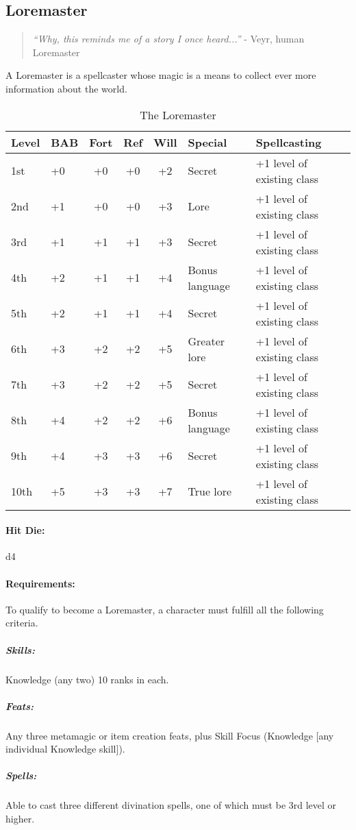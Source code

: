 \subsection{Loremaster}
\begin{quote}
\emph{``Why, this reminds me of a story I once heard...''}
- Veyr, human Loremaster
\end{quote}
A Loremaster is a spellcaster whose magic is a means to collect ever more information about the world.

\begin{table*}
\centering
\caption{The Loremaster}
\label{tab:Loremaster}
\begin{tabular}{llcccll}
\toprule
Level	&BAB	&Fort 	&Ref 	&Will 	&Special	&Spellcasting\\
\midrule
1st	&+0	&+0	&+0	&+2	&Secret		&+1 level of existing class\\
2nd	&+1	&+0	&+0	&+3	&Lore		&+1 level of existing class\\
3rd	&+1	&+1	&+1	&+3	&Secret		&+1 level of existing class\\
4th	&+2	&+1	&+1	&+4	&Bonus language	&+1 level of existing class\\
5th	&+2	&+1	&+1	&+4	&Secret		&+1 level of existing class\\
6th	&+3	&+2	&+2	&+5	&Greater lore	&+1 level of existing class\\
7th	&+3	&+2	&+2	&+5	&Secret		&+1 level of existing class\\
8th	&+4	&+2	&+2	&+6	&Bonus language	&+1 level of existing class\\
9th	&+4	&+3	&+3	&+6	&Secret		&+1 level of existing class\\
10th	&+5	&+3	&+3	&+7	&True lore	&+1 level of existing class\\
\bottomrule
\end{tabular}
\end{table*}

\paragraph{Hit Die:} d4
\paragraph{Requirements:}
To qualify to become a Loremaster, a character must fulfill all the following criteria.
\subparagraph{Skills:} Knowledge (any two) 10 ranks in each.
\subparagraph{Feats:} Any three metamagic or item creation feats, plus Skill Focus (Knowledge [any individual Knowledge skill]).
\subparagraph{Spells:} Able to cast three different divination spells, one of which must be 3rd level or higher.
